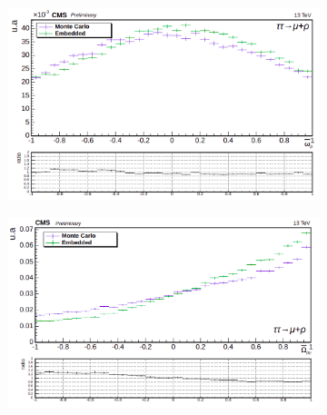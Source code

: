 \begin{figure}
    \begin{subfigure}[b]{0.5\linewidth}
    \centering
    \includegraphics[width=\linewidth]{Chapitre6/Images/OptVar/omegabar_rho_rhomu.png} 
    \caption*{} 
    \vspace{10mm}
  \end{subfigure}%
  \begin{subfigure}[b]{0.5\linewidth}
    \centering
    \includegraphics[width=\linewidth]{Chapitre6/Images/OptVar/Omegabar_rhomu.png} 
    \caption*{} 
    \vspace{10mm}
  \end{subfigure}
  

\end{figure}
